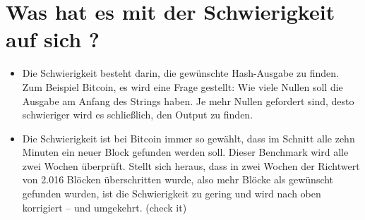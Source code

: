 \documentclass[ngerman]{scrreprt}
\begin{document}
\section{Was hat es mit der Schwierigkeit auf sich ?}
\begin{itemize}
\item{Die Schwierigkeit besteht darin, die gewünschte Hash-Ausgabe zu finden. Zum Beispiel Bitcoin, es wird eine Frage gestellt: Wie viele Nullen soll die Ausgabe am Anfang des Strings haben. Je mehr Nullen gefordert sind, desto schwieriger wird es schließlich, den Output zu finden.}
\item{Die Schwierigkeit ist bei Bitcoin immer so gewählt, dass im Schnitt alle zehn Minuten ein neuer Block gefunden werden soll. Dieser Benchmark wird alle zwei Wochen überprüft. Stellt sich heraus, dass in zwei Wochen der Richtwert von 2.016 Blöcken überschritten wurde, also mehr Blöcke als gewünscht gefunden wurden, ist die Schwierigkeit zu gering und wird nach oben korrigiert – und umgekehrt. (check it)}
\end{itemize}
\end{document}
